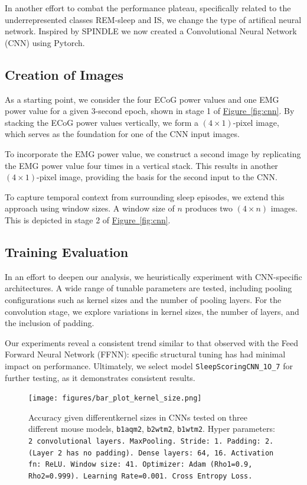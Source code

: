 \documentclass{article}
\begin{document}
\begin{multicols}{2}
In another effort to combat the performance plateau, specifically related to the underrepresented classes REM-sleep and IS, we change the type of artifical neural network. Inspired by SPINDLE \cite{miladinovic_SPINDLE_2019} we now created a Convolutional Neural Network (CNN) using Pytorch. 

\subsection*{Creation of Images}
As a starting point, we consider the four ECoG power values and one EMG power value for a given 3-second epoch, shown in stage 1 of \hyperref[fig:cnn]{Figure~\ref*{fig:cnn}}. By stacking the ECoG power values vertically, we form a $(4\times1)$-pixel image, which serves as the foundation for one of the CNN input images.

To incorporate the EMG power value, we construct a second image by replicating the EMG power value four times in a vertical stack. This results in another  $(4\times1)$-pixel image, providing the basis for the second input to the CNN. 

To capture temporal context from surrounding sleep episodes, we extend this approach using window sizes. A window size of $n$ produces two $(4\times n)$ images. This is depicted in stage 2 of \hyperref[fig:cnn]{Figure~\ref*{fig:cnn}}.

\subsection*{Training Evaluation}
In an effort to deepen our analysis, we heuristically experiment with CNN-specific architectures. A wide range of tunable parameters are tested, including pooling configurations such as kernel sizes and the number of pooling layers. For the convolution stage, we explore variations in kernel sizes, the number of layers, and the inclusion of padding.

Our experiments reveal a consistent trend similar to that observed with the Feed Forward Neural Network (FFNN): specific structural tuning has had minimal impact on performance. Ultimately, we select model \texttt{SleepScoringCNN\_1O\_7} for further testing, as it demonstrates consistent results. 

\begin{figure}[H]
    \centering
    \texttt{[image: figures/bar\_plot\_kernel\_size.png]} 
    \caption{Accuracy given differentkernel sizes in CNNs tested on three different mouse models, \texttt{b1aqm2}, \texttt{b2wtm2}, \texttt{b1wtm2}. Hyper parameters: \texttt{2 convolutional layers. MaxPooling. Stride: 1. Padding: 2. (Layer 2 has no padding). Dense layers: 64, 16. Activation fn: ReLU. Window size: 41. Optimizer: Adam (Rho1=0.9, Rho2=0.999). Learning Rate=0.001. Cross Entropy Loss.}}
    \label{fig:kernel_sizes}
\end{figure}


\end{multicols}
\end{document}
